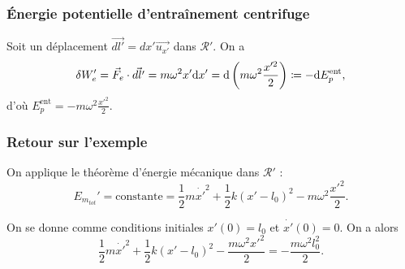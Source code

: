         \subsubsection{Énergie potentielle d'entraînement \og centrifuge\fg}
            
            Soit un déplacement $\vec{dl'}=dx'\vec{u_{x'}}$ dans $\mathcal{R}'$. On a 
            \begin{equation}
                \delta W_{e}'=\vec{F}_e\cdot\vec{dl'}=m\omega^{2}x'\mathrm{d} x'=\mathrm{d}\left(m\omega^{2}\frac{x'^{2}}{2}\right)\coloneqq -\mathrm{d} E_p^{\text{ent}},
            \end{equation}
            d'où $E_p^{\text{ent}}=-m\omega^{2}\frac{x'^{2}}{2}$.

        \subsubsection{Retour sur l'exemple}

            On applique le théorème d'énergie mécanique dans $\mathcal{R}'$ :
            \begin{equation}
                E_{m_{tot}}'=\text{constante}=\frac{1}{2}m\dot{x'}^{2}+\frac{1}{2}k(x'-l_0)^{2}-m\omega^{2}\frac{x'^{2}}{2}.
            \end{equation}

            On se donne comme conditions initiales $x'(0)=l_0$ et $\dot{x'}(0)=0$. On a alors 
            \begin{equation}
                \boxed{
                    \frac{1}{2}m\dot{x'}^{2}+\frac{1}{2}k(x'-l_0)^{2}-\frac{m\omega^{2}x'^{2}}{2}=-\frac{m\omega^{2}l_0^{2}}{2}.
                }
            \end{equation}
